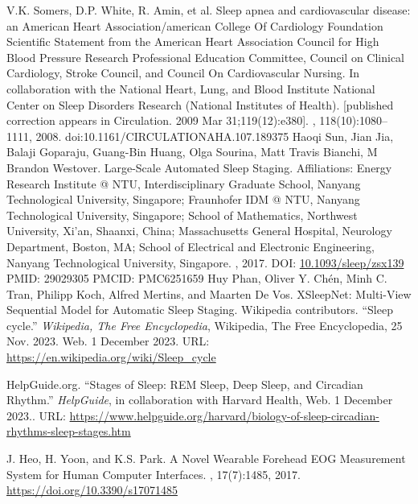 \documentclass[12pt, a4paper,oneside]{book}
\numberwithin{equation}{section}
\begin{document}
\begin{thebibliography}{999}
V.K. Somers, D.P. White, R. Amin, et al.
\newblock Sleep apnea and cardiovascular disease: an American Heart Association/american College Of Cardiology Foundation Scientific Statement from the American Heart Association Council for High Blood Pressure Research Professional Education Committee, Council on Clinical Cardiology, Stroke Council, and Council On Cardiovascular Nursing. In collaboration with the National Heart, Lung, and Blood Institute National Center on Sleep Disorders Research (National Institutes of Health). [published correction appears in Circulation. 2009 Mar 31;119(12):e380].
, 118(10):1080--1111, 2008.
\newblock doi:10.1161/CIRCULATIONAHA.107.189375
Haoqi Sun, Jian Jia, Balaji Goparaju, Guang-Bin Huang, Olga Sourina, Matt Travis Bianchi, M Brandon Westover.
\newblock Large-Scale Automated Sleep Staging.
\newblock Affiliations: Energy Research Institute @ NTU, Interdisciplinary Graduate School, Nanyang Technological University, Singapore; Fraunhofer IDM @ NTU, Nanyang Technological University, Singapore; School of Mathematics, Northwest University, Xi'an, Shaanxi, China; Massachusetts General Hospital, Neurology Department, Boston, MA; School of Electrical and Electronic Engineering, Nanyang Technological University, Singapore.
, 2017.
\newblock DOI: \url{10.1093/sleep/zsx139}
\newblock PMID: 29029305
\newblock PMCID: PMC6251659
Huy Phan, Oliver Y. Chén, Minh C. Tran, Philipp Koch, Alfred Mertins, and Maarten De Vos.
\newblock XSleepNet: Multi-View Sequential Model for Automatic Sleep Staging.
Wikipedia contributors. 
\newblock ``Sleep cycle.''
\newblock \textit{Wikipedia, The Free Encyclopedia}, 
\newblock Wikipedia, The Free Encyclopedia, 25 Nov. 2023.
\newblock Web. 1 December 2023.
\newblock URL: \url{https://en.wikipedia.org/wiki/Sleep_cycle}

HelpGuide.org.
\newblock ``Stages of Sleep: REM Sleep, Deep Sleep, and Circadian Rhythm.''
\newblock \textit{HelpGuide}, in collaboration with Harvard Health,
\newblock Web. 1 December 2023..
\newblock URL: \url{https://www.helpguide.org/harvard/biology-of-sleep-circadian-rhythms-sleep-stages.htm}

J. Heo, H. Yoon, and K.S. Park.
\newblock A Novel Wearable Forehead EOG Measurement System for Human Computer Interfaces.
, 17(7):1485, 2017.
\newblock \url{https://doi.org/10.3390/s17071485}


\end{thebibliography}
\end{document}
